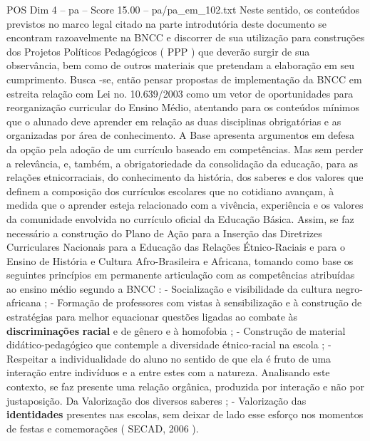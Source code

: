 \begin{textsample}{POS Dim 4 – pa – Score 15.00 – pa/pa\_em\_102.txt}
Neste sentido, os conteúdos previstos no marco legal citado na parte introdutória deste documento se encontram razoavelmente na BNCC e discorrer de sua utilização para construções dos Projetos Políticos Pedagógicos ( PPP ) que deverão surgir de sua observância, bem como de outros materiais que pretendam a elaboração em seu cumprimento.
Busca -se, então pensar propostas de implementação da BNCC em estreita relação com Lei no. 10.639/2003 como um vetor de oportunidades para reorganização curricular do Ensino Médio, atentando para os conteúdos mínimos que o alunado deve aprender em relação as duas disciplinas obrigatórias e as organizadas por área de conhecimento.
A Base apresenta argumentos em defesa da opção pela adoção de um currículo baseado em competências.
Mas sem perder a relevância, e, também, a obrigatoriedade da consolidação da educação, para as relações etnicorraciais, do conhecimento da história, dos saberes e dos valores que definem a composição dos currículos escolares que no cotidiano avançam, à medida que o aprender esteja relacionado com a vivência, experiência e os valores da comunidade envolvida no currículo oficial da Educação Básica.
Assim, se faz necessário a construção do Plano de Ação para a Inserção das Diretrizes Curriculares Nacionais para a Educação das Relações Étnico-Raciais e para o Ensino de História e Cultura Afro-Brasileira e Africana, tomando como base os seguintes princípios em permanente articulação com as competências atribuídas ao ensino médio segundo a BNCC : - Socialização e visibilidade da cultura negro-africana ; - Formação de professores com vistas à sensibilização e à construção de estratégias para melhor equacionar questões ligadas ao combate às \textbf{discriminações} \textbf{racial} e de gênero e à homofobia ; - Construção de material didático-pedagógico que contemple a diversidade étnico-racial na escola ; - Respeitar a individualidade do aluno no sentido de que ela é fruto de uma interação entre indivíduos e a entre estes com a natureza.
Analisando este contexto, se faz presente uma relação orgânica, produzida por interação e não por justaposição.
Da Valorização dos diversos saberes ; - Valorização das \textbf{identidades} presentes nas escolas, sem deixar de lado esse esforço nos momentos de festas e comemorações ( SECAD, 2006 ).

\end{textsample}
